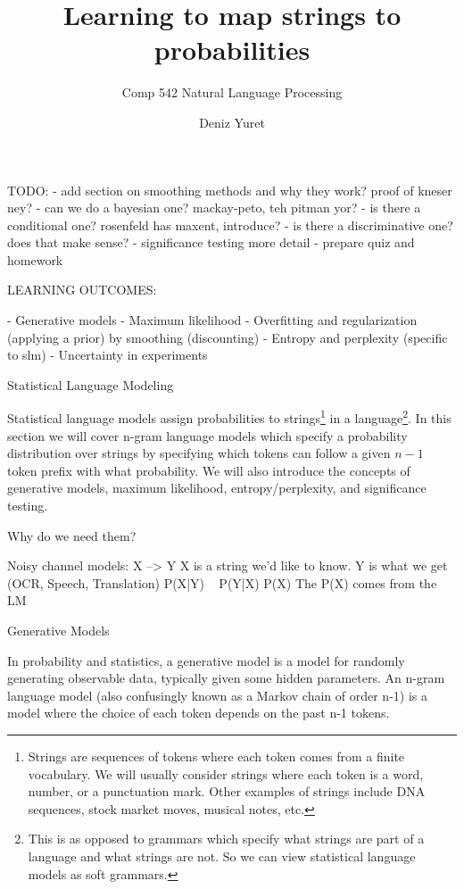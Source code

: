 \documentclass[ignorenonframetext]{beamer}
\title{Learning to map strings to probabilities}
\subtitle{Comp 542 Natural Language Processing}
\author{Deniz Yuret}
\begin{document}
\begin{frame}
\maketitle
\end{frame}


TODO:
- add section on smoothing methods and why they work?  proof of kneser ney?
- can we do a bayesian one?  mackay-peto, teh pitman yor?
- is there a conditional one?  rosenfeld has maxent, introduce?
- is there a discriminative one?  does that make sense?
- significance testing more detail
- prepare quiz and homework

LEARNING OUTCOMES:

- Generative models
- Maximum likelihood
- Overfitting and regularization (applying a prior) by smoothing (discounting)
- Entropy and perplexity (specific to slm)
- Uncertainty in experiments


Statistical Language Modeling

Statistical language models assign probabilities to
strings\footnote{Strings are sequences of tokens where each token
  comes from a finite vocabulary.  We will usually consider strings
  where each token is a word, number, or a punctuation mark.  Other
  examples of strings include DNA sequences, stock market moves,
  musical notes, etc.}  in a language\footnote{This is as opposed to
  grammars which specify what strings are part of a language and what
  strings are not.  So we can view statistical language models as soft
  grammars.}.  In this section we will cover n-gram language models
which specify a probability distribution over strings by specifying
which tokens can follow a given $n-1$ token prefix with what
probability.  We will also introduce the concepts of generative
models, maximum likelihood, entropy/perplexity, and significance
testing.

Why do we need them?

Noisy channel models: X --> Y
X is a string we'd like to know.
Y is what we get (OCR, Speech, Translation)
P(X|Y) ~ P(Y|X) P(X)
The P(X) comes from the LM


Generative Models

In probability and statistics, a generative model is a model for
randomly generating observable data, typically given some hidden
parameters.  An n-gram language model (also confusingly known as a
Markov chain of order n-1) is a model where the choice of each token
depends on the past n-1 tokens.
\end{document}
